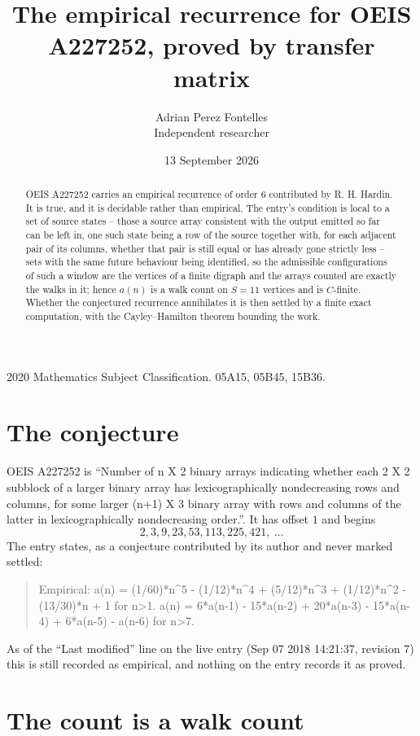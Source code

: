 \documentclass[11pt,a4paper]{article}
\title{The empirical recurrence for OEIS A227252, proved by transfer matrix}
\author{Adrian Perez Fontelles\\ \small Independent researcher}
\date{13 September 2026}
\theoremstyle{plain}
\theoremstyle{definition}
\begin{document}
\maketitle

\begin{abstract}
OEIS A227252 carries an empirical recurrence of order $6$ contributed by R. H. Hardin. It is
true, and it is decidable rather than empirical. The entry's condition is local to a set of source states -- those a source array consistent with the output emitted so far can be left in, one such state being a row of the source together with, for each adjacent pair of its columns, whether that pair is still equal or has already gone strictly less -- sets with the same future behaviour being identified, so
the admissible configurations of such a window are the vertices of a finite digraph and the
arrays counted are exactly the walks in it; hence $a(n)$ is a walk count on $S=11$ vertices
and is $C$-finite. Whether the conjectured recurrence annihilates it is then settled by a
finite exact computation, with the Cayley--Hamilton theorem bounding the work.
\end{abstract}

\noindent\small 2020 Mathematics Subject Classification. 05A15, 05B45, 15B36.\normalsize

\section{The conjecture}

OEIS A227252 is ``Number of n X 2 binary arrays indicating whether each 2 X 2 subblock of a larger binary array has lexicographically nondecreasing rows and columns, for some larger (n+1) X 3 binary array with rows and columns of the latter in lexicographically nondecreasing order.''. It has offset $1$ and begins
\[
2, 3, 9, 23, 53, 113, 225, 421,\ \dots
\]
The entry states, as a conjecture contributed by its author and never marked settled:
\begin{quote}
Empirical: a(n) = (1/60)*n\^{}5 - (1/12)*n\^{}4 + (5/12)*n\^{}3 + (1/12)*n\^{}2 - (13/30)*n + 1 for n>1. a(n) = 6*a(n-1) - 15*a(n-2) + 20*a(n-3) - 15*a(n-4) + 6*a(n-5) - a(n-6) for n>7.
\end{quote}
As of the ``Last modified'' line on the live entry (Sep 07 2018 14:21:37, revision 7) this is still
recorded as empirical, and nothing on the entry records it as proved.

\section{The count is a walk count}
\end{document}
